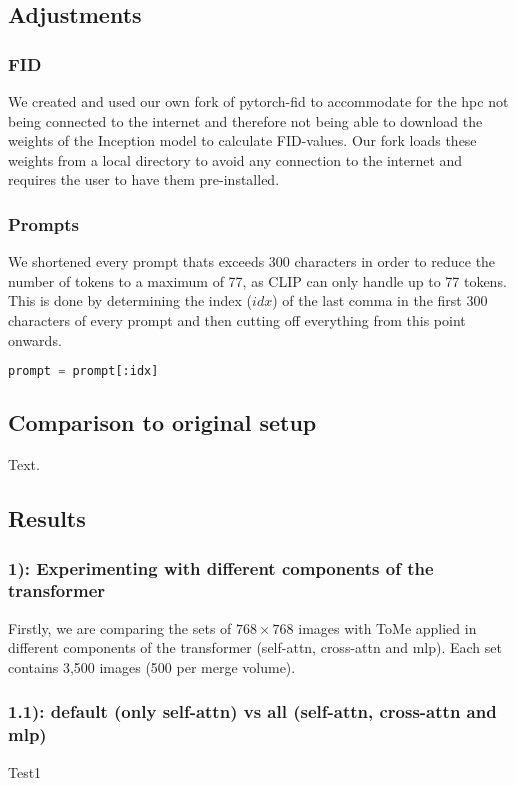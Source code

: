 \subsection{Adjustments}
\subsubsection*{FID}
We created and used our own fork of pytorch-fid\cite{Seitzer2020FID} to accommodate for the hpc not being connected to the internet and therefore not being able to download the weights of the Inception model to calculate FID-values. Our fork loads these weights from a local directory to avoid any connection to the internet and requires the user to have them pre-installed.

\subsubsection*{Prompts}
We shortened every prompt thats exceeds 300 characters in order to reduce the number of tokens to a maximum of 77, as CLIP\cite{radford2021learning} can only handle up to 77 tokens.\\
This is done by determining the index (\(idx\)) of the last comma in the first 300 characters of every prompt and then cutting off everything from this point onwards.
\begin{lstlisting}[language=Python]
prompt = prompt[:idx]
\end{lstlisting}

\subsection{Comparison to original setup}
Text.

\subsection{Results}
\subsubsection*{1): Experimenting with different components of the transformer}
Firstly, we are comparing the sets of $768 \times 768$ images with ToMe applied in different components of the transformer (self-attn, cross-attn and mlp). Each set contains 3,500 images (500 per merge volume).

\newpage
\subsubsection*{1.1): default (only self-attn) vs all (self-attn, cross-attn and mlp)}
%   
%   

Test1

